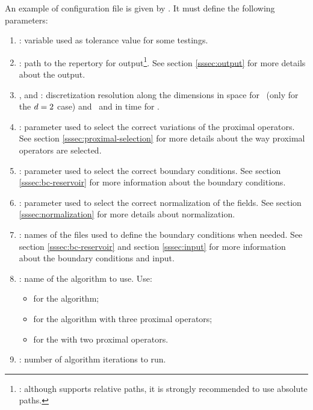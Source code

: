         An example of configuration file is given by . It must define the following
        parameters:
        \begin{enumerate}
            \item {}: variable used as tolerance value for some testings.
            \item {}: path to the repertory for 
                output\footnote{\NB{}: although \python{} supports relative paths, it is strongly recommended to use absolute paths.}. See 
                section \ref{sssec:output} for more details about the output.
            \item {},  and : discretization resolution along the dimensions in space for 
                 (only for the $d{}=2$ case) and  and in time for .
            \item {}: parameter used to select the correct variations of the proximal operators. 
                See section \ref{sssec:proximal-selection} for more details about the way proximal operators are selected.
            \item {}: parameter used to select the correct boundary conditions. See section \ref{sssec:bc-reservoir} for 
                more information about the boundary conditions.
            \item {}: parameter used to select the correct normalization of the fields. See section \ref{sssec:normalization}
                for more details about normalization.
            \item {}: names of the files used to define the boundary conditions when needed. See section \ref{sssec:bc-reservoir} and
                section \ref{sssec:input} for more information about the boundary conditions and input.
            \item {}: name of the algorithm to use. Use:
                \begin{itemize}
                    \item {} for the \pdAlgo{} algorithm;
                    \item {} for the \drAlgo{} algorithm with three proximal operators;
                    \item {} for the \drAlgo{} with two proximal operators. 
                \end{itemize}
            \item {}: number of algorithm iterations to run.

\end{enumerate}
